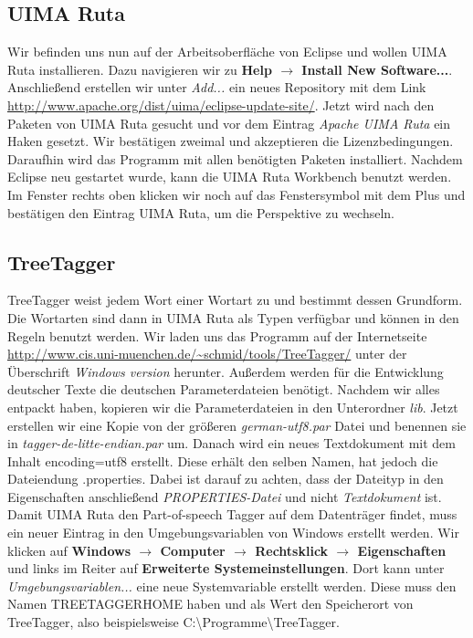 \documentclass{article}
\begin{document}
\subsection{UIMA Ruta}
Wir befinden uns nun auf der Arbeitsoberfläche von Eclipse und wollen UIMA Ruta installieren. Dazu navigieren wir zu \textbf{Help $\rightarrow$ Install New Software...}. Anschließend erstellen wir unter \textit{Add...} ein neues Repository mit dem Link \url{http://www.apache.org/dist/uima/eclipse-update-site/}. Jetzt wird nach den Paketen von UIMA Ruta gesucht und vor dem Eintrag \textit{Apache UIMA Ruta} ein Haken gesetzt. Wir bestätigen zweimal und akzeptieren die Lizenzbedingungen. Daraufhin wird das Programm mit allen benötigten Paketen installiert. Nachdem Eclipse neu gestartet wurde, kann die UIMA Ruta Workbench benutzt werden. Im Fenster rechts oben klicken wir noch auf das Fenstersymbol mit dem Plus und bestätigen den Eintrag UIMA Ruta, um die Perspektive zu wechseln.

\subsection{TreeTagger}\label{tt}
TreeTagger weist jedem Wort einer Wortart zu und bestimmt dessen Grundform. Die Wortarten sind dann in UIMA Ruta als Typen verfügbar und können in den Regeln benutzt werden. Wir laden uns das Programm auf der Internetseite \url{http://www.cis.uni-muenchen.de/~schmid/tools/TreeTagger/} unter der Überschrift \textit{Windows version} herunter. Außerdem werden für die Entwicklung deutscher Texte die deutschen Parameterdateien benötigt. Nachdem wir alles entpackt haben, kopieren wir die Parameterdateien in den Unterordner \textit{lib}. Jetzt erstellen wir eine Kopie von der größeren \textit{german-utf8.par} Datei und benennen sie in \textit{tagger-de-litte-endian.par} um. Danach wird ein neues Textdokument mit dem Inhalt \glqq encoding=utf8\grqq{} erstellt. Diese erhält den selben Namen, hat jedoch die Dateiendung \glqq .properties\grqq{}. Dabei ist darauf zu achten, dass der Dateityp in den Eigenschaften anschließend \textit{PROPERTIES-Datei} und nicht \textit{Textdokument} ist. Damit UIMA Ruta den Part-of-speech Tagger auf dem Datenträger findet, muss ein neuer Eintrag in den Umgebungsvariablen von Windows erstellt werden. Wir klicken auf \textbf{Windows $\rightarrow$ Computer $\rightarrow$ Rechtsklick $\rightarrow$ Eigenschaften} und links im Reiter auf \textbf{Erweiterte Systemeinstellungen}. Dort kann unter \textit{Umgebungsvariablen...} eine neue Systemvariable erstellt werden. Diese muss den Namen \glqq TREETAGGER\textunderscore HOME\grqq{} haben und als Wert den Speicherort von TreeTagger, also beispielsweise \glqq C:\textbackslash Programme\textbackslash TreeTagger\grqq{}.
\end{document}
